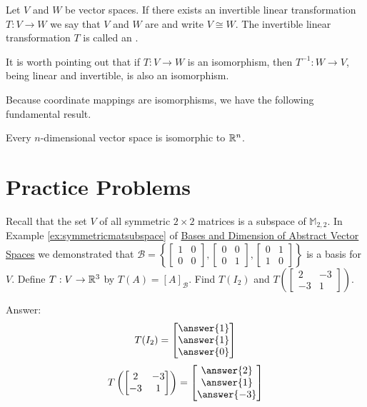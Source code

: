 \documentclass{ximera}
\begin{document}
\begin{definition}\label{def:isomorphism} Let $V$ and $W$ be vector spaces.  If there exists an invertible linear transformation $T:V\rightarrow W$ we say that $V$ and $W$ are  and write $V\cong W$.  The invertible linear transformation $T$ is called an .
\end{definition}

It is worth pointing out that if $T:V\rightarrow W$ is an isomorphism, then $T^{-1}:W\rightarrow V$, being linear and invertible, is also an isomorphism.

Because coordinate mappings are isomorphisms, we have the following fundamental result.

\begin{theorem}\label{th:ndimisotorn}
Every $n$-dimensional vector space is isomorphic to $\mathbb{R}^n$.
\end{theorem}



\section*{Practice Problems}

\begin{problem}\label{prob:symmMatLinTrans}
Recall that the set $V$ of all symmetric $2\times 2$ matrices is a subspace of $\mathbb{M}_{2,2}$.  In Example \ref{ex:symmetricmatsubspace} of \href{https://ximera.osu.edu/linearalgebradzv3/LinearAlgebraInteractiveIntro/VSP-0060/main}{Bases and Dimension of Abstract Vector Spaces} we demonstrated that $\mathcal{B} = \left\{
\begin{bmatrix}
1 & 0 \\
0 & 0
\end{bmatrix}, \begin{bmatrix}
0 & 0 \\
0 & 1
\end{bmatrix}, \begin{bmatrix}
0 & 1 \\
1 & 0
\end{bmatrix}
\right\}$ is a basis for $V$.  Define $T:V\rightarrow \mathbb{R}^3$ by $T(A)=[A]_{\mathcal{B}}$.  Find $T(I_2)$ and $T\left(\begin{bmatrix}2&-3\\-3&1\end{bmatrix}\right)$.

Answer:
$$T(I_2)=\begin{bmatrix}\answer{1}\\\answer{1}\\\answer{0}\end{bmatrix}$$
$$T\left(\begin{bmatrix}2&-3\\-3&1\end{bmatrix}\right)=\begin{bmatrix}\answer{2}\\\answer{1}\\\answer{-3}\end{bmatrix}$$
\end{problem}
\end{document}
